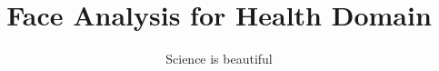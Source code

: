 \documentclass[
  doctype=phdplan,          %
  school=unl/fct,       %
  lang=en,              %
  coverlang=pt,         %
  copyrightlang=pt,     %
  fontstyle=kpfonts,    %
  chapstyle=elegant,    %
  otherlistsat=front,   %
  aftercover=false,     %
	linkscolor=darkblue,  %
  printcommittee=true,  %
	spine=false,          %
	biblatex={            %
		style=numeric,      %
		sorting=nyt,        %
		firstinits=true,    %
		sortcites=true,     %
    hyperref=true       %
	},
	memoir={	            %
    a4paper,            %
    11pt,               %
    draft,              %
  },
  media=screen,         %
]{unlthesis}
\title{Face Analysis for Health Domain}
\subtitle{Science is beautiful}
\begin{document}
\thesisfrontmatter	%
\printcoverpage		%
\printaftercover
\printcopyright		%
\printdedicatory	%
\printacknowledgements	%
\printquote		%
\printabstract		%
\tableofcontents* 	%
\printotherlists 	%


\thesismainmatter	%
\printchapthers		%
\printbib		%
\printotherlists 	%
\printappendixes	%
\printbackcoverpage
\end{document}
